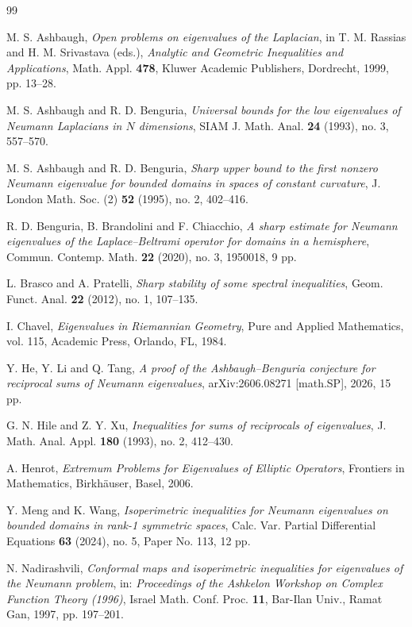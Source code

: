 \documentclass[11pt]{amsart}
\theoremstyle{remark}
\begin{document}
\begin{thebibliography}{99}

M. S. Ashbaugh,
\emph{Open problems on eigenvalues of the Laplacian},
in T. M. Rassias and H. M. Srivastava (eds.),
\emph{Analytic and Geometric Inequalities and Applications},
Math. Appl. \textbf{478}, Kluwer Academic Publishers, Dordrecht, 1999, pp. 13--28.

M. S. Ashbaugh and R. D. Benguria,
\emph{Universal bounds for the low eigenvalues of Neumann Laplacians in $N$ dimensions},
SIAM J. Math. Anal. \textbf{24} (1993), no. 3, 557--570.

M. S. Ashbaugh and R. D. Benguria,
\emph{Sharp upper bound to the first nonzero Neumann eigenvalue for bounded domains in spaces of constant curvature},
J. London Math. Soc. (2) \textbf{52} (1995), no. 2, 402--416.

R. D. Benguria, B. Brandolini and F. Chiacchio,
\emph{A sharp estimate for Neumann eigenvalues of the Laplace--Beltrami operator for domains in a hemisphere},
Commun. Contemp. Math. \textbf{22} (2020), no. 3, 1950018, 9 pp.

L. Brasco and A. Pratelli,
\emph{Sharp stability of some spectral inequalities},
Geom. Funct. Anal. \textbf{22} (2012), no. 1, 107--135.

I. Chavel,
\emph{Eigenvalues in Riemannian Geometry},
Pure and Applied Mathematics, vol. 115, Academic Press, Orlando, FL, 1984.

Y. He, Y. Li and Q. Tang,
\emph{A proof of the Ashbaugh--Benguria conjecture for reciprocal sums of Neumann eigenvalues},
arXiv:2606.08271 [math.SP], 2026, 15 pp.

G. N. Hile and Z. Y. Xu,
\emph{Inequalities for sums of reciprocals of eigenvalues},
J. Math. Anal. Appl. \textbf{180} (1993), no. 2, 412--430.

A. Henrot,
\emph{Extremum Problems for Eigenvalues of Elliptic Operators},
Frontiers in Mathematics, Birkh\"auser, Basel, 2006.

Y. Meng and K. Wang,
\emph{Isoperimetric inequalities for Neumann eigenvalues on bounded domains in rank-1 symmetric spaces},
Calc. Var. Partial Differential Equations \textbf{63} (2024), no. 5, Paper No. 113, 12 pp.

N. Nadirashvili,
\emph{Conformal maps and isoperimetric inequalities for eigenvalues of the Neumann problem},
in: \emph{Proceedings of the Ashkelon Workshop on Complex Function Theory (1996)},
Israel Math. Conf. Proc. \textbf{11}, Bar-Ilan Univ., Ramat Gan, 1997, pp. 197--201.


\end{thebibliography}
\end{document}

